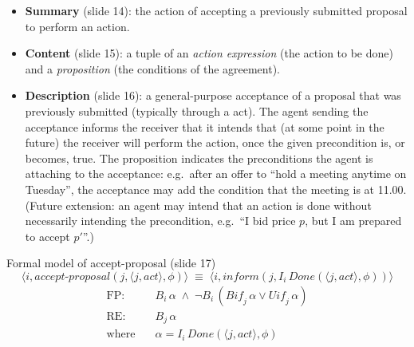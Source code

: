 \begin{itemize}
  \item \textbf{Summary} (slide 14): the action of accepting a previously submitted proposal
        to perform an action.
  \item \textbf{Content} (slide 15): a tuple of an \emph{action expression} (the action to be
        done) and a \emph{proposition} (the conditions of the agreement).
  \item \textbf{Description} (slide 16): a general-purpose acceptance of a proposal that was
        previously submitted (typically through a  act). The agent sending the
        acceptance informs the receiver that it intends that (at some point in the future)
        the receiver will perform the action, once the given precondition is, or becomes,
        true. The proposition indicates the preconditions the agent is attaching to the
        acceptance: e.g.\ after an offer to ``hold a meeting anytime on Tuesday'', the
        acceptance may add the condition that the meeting is at 11.00. (Future extension: an
        agent may intend that an action is done without necessarily intending the
        precondition, e.g.\ ``I bid price $p$, but I am prepared to accept $p'$''.)
\end{itemize}

\begin{nbdef}{Formal model of accept-proposal (slide 17)}
\[
\langle i, \mathit{accept\text{-}proposal}(j, \langle j, act\rangle, \phi)\rangle \;\equiv\;
\langle i, \mathit{inform}(j, I_i\,\mathit{Done}(\langle j, act\rangle, \phi))\rangle
\]
\begin{align*}
\text{FP:}\quad & B_i\,\alpha \;\land\; \neg B_i\,(\mathit{Bif}_j\,\alpha \lor \mathit{Uif}_j\,\alpha) \\
\text{RE:}\quad & B_j\,\alpha \\
\text{where}\quad & \alpha = I_i\,\mathit{Done}(\langle j, act\rangle, \phi)
\end{align*}
\end{nbdef}

